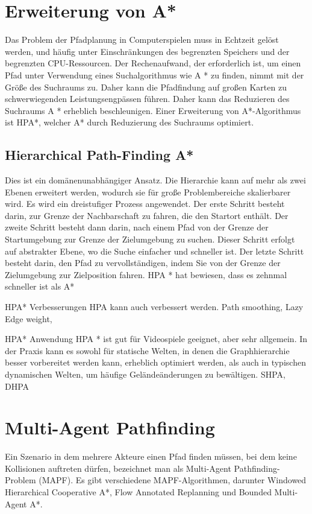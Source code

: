 \section{Erweiterung von A*}
Das Problem der Pfadplanung in Computerspielen muss in Echtzeit gelöst werden, und  häufig unter Einschränkungen des begrenzten Speichers und der begrenzten CPU-Ressourcen. Der Rechenaufwand, der erforderlich ist, um einen Pfad unter Verwendung eines Suchalgorithmus wie A * zu finden, nimmt mit der Größe des Suchraums zu. Daher kann die Pfadfindung auf großen Karten zu schwerwiegenden Leistungsengpässen führen. Daher kann das Reduzieren des Suchraums A * erheblich beschleunigen. Einer Erweiterung von A*-Algorithmus ist HPA*, welcher A* durch Reduzierung des Suchraums optimiert\cite{hpa}. %

\subsection{Hierarchical Path-Finding A*}
Dies ist ein domänenunabhängiger Ansatz. Die Hierarchie kann auf mehr als zwei Ebenen erweitert werden, wodurch sie für große Problembereiche skalierbarer wird. Es wird ein dreistufiger Prozess angewendet. Der erste Schritt besteht darin, zur Grenze der Nachbarschaft zu fahren, die den Startort enthält. Der zweite Schritt besteht dann darin, nach einem Pfad von der Grenze der Startumgebung zur Grenze der Zielumgebung zu suchen. Dieser Schritt erfolgt auf abstrakter Ebene, wo die Suche einfacher und schneller ist. Der letzte Schritt besteht darin, den Pfad zu vervollständigen, indem Sie von der Grenze der Zielumgebung zur Zielposition fahren. HPA * hat bewiesen, dass es zehnmal schneller ist als A*\cite{hpa}

HPA* Verbesserungen
HPA kann auch verbessert werden. Path smoothing, Lazy Edge weight,

HPA* Anwendung%
HPA * ist gut für Videospiele geeignet, aber sehr allgemein. In der Praxis kann es sowohl für statische Welten, in denen die Graphhierarchie besser vorbereitet werden kann, erheblich optimiert werden, als auch in typischen dynamischen Welten, um häufige Geländeänderungen zu bewältigen. 
SHPA, 
DHPA



\section{Multi-Agent Pathfinding}
Ein Szenario in dem mehrere Akteure einen Pfad finden müssen, bei dem keine Kollisionen auftreten dürfen, bezeichnet man als Multi-Agent Pathfinding-Problem (MAPF). Es gibt verschiedene MAPF-Algorithmen, darunter Windowed Hierarchical Cooperative A*, Flow Annotated Replanning und Bounded Multi-Agent A*.

